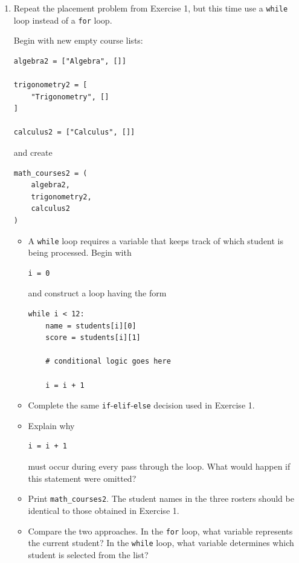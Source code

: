 \documentclass{article}
\begin{document}
\begin{enumerate}

\item Repeat the placement problem from Exercise 1, but this
time use a \texttt{while} loop instead of a
\texttt{for} loop.

Begin with new empty course lists:

\begin{verbatim}
algebra2 = ["Algebra", []]

trigonometry2 = [
    "Trigonometry", []
]

calculus2 = ["Calculus", []]
\end{verbatim}

and create

\begin{verbatim}
math_courses2 = (
    algebra2,
    trigonometry2,
    calculus2
)
\end{verbatim}

\begin{itemize}

\item A \texttt{while} loop requires a variable that keeps
track of which student is being processed.  Begin with

\begin{verbatim}
i = 0
\end{verbatim}

and construct a loop having the form

\begin{verbatim}
while i < 12:
    name = students[i][0]
    score = students[i][1]

    # conditional logic goes here

    i = i + 1
\end{verbatim}

\item Complete the same
\texttt{if}-\texttt{elif}-\texttt{else} decision used in
Exercise 1.

\item Explain why

\begin{verbatim}
i = i + 1
\end{verbatim}

must occur during every pass through the loop.  What would
happen if this statement were omitted?

\item Print \texttt{math\_courses2}.  The student names in
the three rosters should be identical to those obtained in
Exercise 1.

\item Compare the two approaches.  In the \texttt{for} loop,
what variable represents the current student?  In the
\texttt{while} loop, what variable determines which student
is selected from the list?

\end{itemize}
\end{enumerate}
\end{document}
